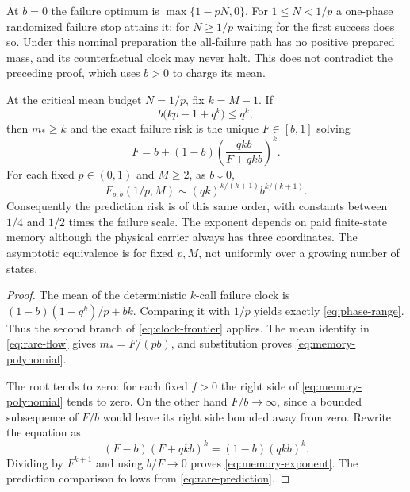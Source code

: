 At $b=0$ the failure optimum is $\max\{1-pN,0\}$. For $1\le N<1/p$ a one-phase randomized failure stop attains it; for $N\ge1/p$ waiting for the first success does so. Under this nominal preparation the all-failure path has no positive prepared mass, and its counterfactual clock may never halt. This does not contradict the preceding proof, which uses $b>0$ to charge its mean.

\begin{corollary}\label{cor:memory-exponent}
At the critical mean budget $N=1/p$, fix $k=M-1$. If
\begin{equation}\label{eq:phase-range}
 b\bigl(kp-1+q^k\bigr)\le q^k,
\end{equation}
then $m_*\ge k$ and the exact failure risk is the unique $F\in[b,1]$ solving
\begin{equation}\label{eq:memory-polynomial}
 F=b+(1-b)\left(\frac{qkb}{F+qkb}\right)^k.
\end{equation}
For each fixed $p\in(0,1)$ and $M\ge2$, as $b\downarrow0$,
\begin{equation}\label{eq:memory-exponent}
 F_{p,b}(1/p,M)\sim(qk)^{k/(k+1)}b^{k/(k+1)}.
\end{equation}
Consequently the prediction risk is of this same order, with constants between $1/4$ and $1/2$ times the failure scale. The exponent depends on paid finite-state memory although the physical carrier always has three coordinates. The asymptotic equivalence is for fixed $p,M$, not uniformly over a growing number of states.
\end{corollary}
\begin{proof}
The mean of the deterministic $k$-call failure clock is
$(1-b)(1-q^k)/p+bk$. Comparing it with $1/p$ yields exactly \eqref{eq:phase-range}. Thus the second branch of \eqref{eq:clock-frontier} applies. The mean identity in \eqref{eq:rare-flow} gives $m_*=F/(pb)$, and substitution proves \eqref{eq:memory-polynomial}.

The root tends to zero: for each fixed $f>0$ the right side of \eqref{eq:memory-polynomial} tends to zero. On the other hand $F/b\to\infty$, since a bounded subsequence of $F/b$ would leave its right side bounded away from zero. Rewrite the equation as
\[
 (F-b)(F+qkb)^k=(1-b)(qkb)^k.
\]
Dividing by $F^{k+1}$ and using $b/F\to0$ proves
\eqref{eq:memory-exponent}. The prediction comparison follows from
\eqref{eq:rare-prediction}.
\end{proof}

